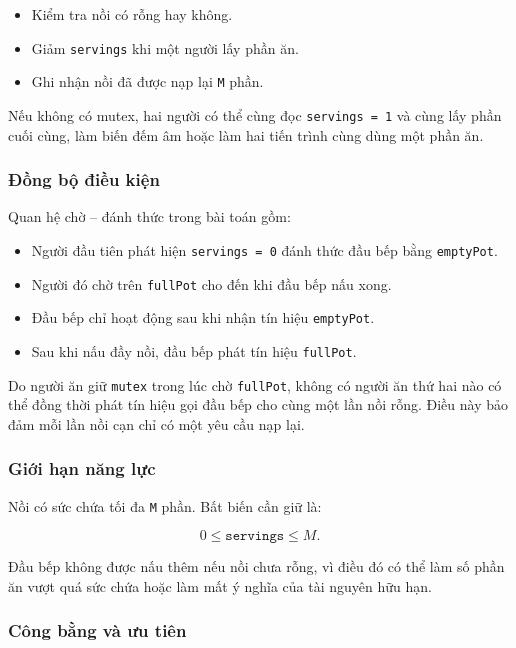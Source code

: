 \begin{itemize}
    \item Kiểm tra nồi có rỗng hay không.
    \item Giảm \texttt{servings} khi một người lấy phần ăn.
    \item Ghi nhận nồi đã được nạp lại \texttt{M} phần.
\end{itemize}

Nếu không có mutex, hai người có thể cùng đọc \texttt{servings = 1} và cùng
lấy phần cuối cùng, làm biến đếm âm hoặc làm hai tiến trình cùng dùng một phần
ăn.

\subsubsection*{Đồng bộ điều kiện}

Quan hệ chờ -- đánh thức trong bài toán gồm:

\begin{itemize}
    \item Người đầu tiên phát hiện \texttt{servings = 0} đánh thức đầu bếp bằng
    \texttt{emptyPot}.
    \item Người đó chờ trên \texttt{fullPot} cho đến khi đầu bếp nấu xong.
    \item Đầu bếp chỉ hoạt động sau khi nhận tín hiệu \texttt{emptyPot}.
    \item Sau khi nấu đầy nồi, đầu bếp phát tín hiệu \texttt{fullPot}.
\end{itemize}

Do người ăn giữ \texttt{mutex} trong lúc chờ \texttt{fullPot}, không có người
ăn thứ hai nào có thể đồng thời phát tín hiệu gọi đầu bếp cho cùng một lần nồi
rỗng. Điều này bảo đảm mỗi lần nồi cạn chỉ có một yêu cầu nạp lại.

\subsubsection*{Giới hạn năng lực}

Nồi có sức chứa tối đa \texttt{M} phần. Bất biến cần giữ là:

\[
    0 \leq \texttt{servings} \leq M.
\]

Đầu bếp không được nấu thêm nếu nồi chưa rỗng, vì điều đó có thể làm số phần ăn
vượt quá sức chứa hoặc làm mất ý nghĩa của tài nguyên hữu hạn.

\subsubsection*{Công bằng và ưu tiên}

